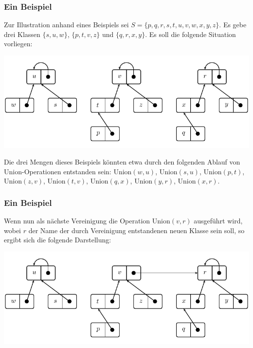 \documentclass[smaller,xcolor=dvipsnames]{beamer}
\newcommand{\opunion}{\text{Union}}
\begin{document}
\begin{frame}
\frametitle{Ein Beispiel}
Zur Illustration anhand eines Beispiels sei $S = \bigl\{ p,q,r,s,t,u,v,w,x,y,z\bigr\}$. Es gebe drei Klassen $\bigl\{s,u,w\bigr\}$, $\bigl\{ p,t,v,z \bigr\}$ und $\bigl\{ q,r,x,y \bigr\}$. Es soll die folgende Situation vorliegen:

\begin{center}
 \includegraphics[scale=0.8]{fig104.pdf}
\end{center}

Die drei Mengen dieses Beispiels könnten etwa durch den folgenden Ablauf von $\opunion$-Operationen entstanden sein: $\opunion{(w,u)}$, $\opunion{(s,u)}$, $\opunion{(p,t)}$, $\opunion{(z,v)}$, $\opunion{(t,v)}$, $\opunion{(q,x)}$, $\opunion{(y,r)}$, $\opunion{(x,r)}$.
\end{frame}

\begin{frame}
\frametitle{Ein Beispiel}
Wenn nun als nächste Vereinigung die Operation $\opunion{(v,r)}$ ausgeführt wird, wobei $r$ der Name der durch Vereinigung entstandenen neuen Klasse sein soll, so ergibt sich die folgende Darstellung:

\begin{center}
 \includegraphics[scale=.8]{fig105.pdf}
\end{center}
\end{frame}
\end{document}
